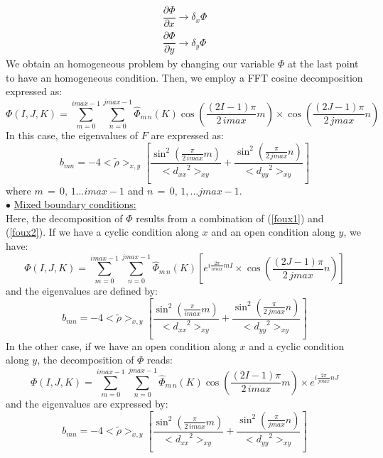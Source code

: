 \begin{eqnarray*}
\dfrac{\partial \Phi}{\partial x} \rightarrow \delta _x \Phi \\
\dfrac{\partial \Phi}{\partial y} \rightarrow \delta _y \Phi
\end{eqnarray*}
We obtain an homogeneous problem by changing our variable $\Phi$ at the last
point to have an homogeneous condition.
 Then, we employ a FFT cosine decomposition expressed as:
\begin{equation}
\label{foux2}
\Phi (I, J, K) =    \sum_{m=0}^{imax-1} \sum_{n=0}^{jmax-1}
\widehat{\Phi}_{m \, n}(K)
\cos \left( \dfrac {(2I - 1) \pi}{2 \, imax} m\right) \times
\cos \left( \dfrac {(2J - 1) \pi}{2 \, jmax} n\right)
\end{equation}
In this case, the eigenvalues of $F$ are expressed as:
\begin{displaymath}
b_{mn} = - 4 <\tilde{\rho}>_{x,y} \left[
\dfrac{\sin ^2 \left( \frac { \pi} {2 \, imax}  m\right)} {<{d_{xx}}^2>_{xy}}
+
\dfrac{\sin ^2 \left( \frac { \pi} {2 \, jmax}  n\right)} {<{d_{yy}}^2>_{xy}}
\right]
\end{displaymath}
where $m\,=\,0, \, 1...imax-1$ and $n\,=\,0,\, 1,...jmax-1$.\\
$\bullet$ \underline{Mixed boundary conditions:}\\
Here, the decomposition of $\Phi$ results from a combination of (\ref{foux1})
and (\ref{foux2}). If we have a cyclic condition along $x$ and an open
condition along $y$, we have:
\begin{equation}
\Phi (I, J, K) =   \sum_{m=0}^{imax-1} \sum_{n=0}^{jmax-1}
\widehat{\Phi}_{m\, n}(K)
\left[ e^ {i\frac {2\pi}{imax} m I } \times
\cos \left( \dfrac {(2J - 1) \pi}{2 \, jmax} n\right) \right]
\end{equation}
and the eigenvalues are defined by:
\begin{equation}
b_{mn} = - 4 < \tilde{\rho} >_{x,y} \left[
\dfrac{\sin ^2 \left( \frac {\pi} {imax} m \right)} {<{d_{xx}}^2>_{xy}} +
\dfrac{\sin ^2 \left( \frac {\pi} {2 \, jmax}  n\right)} {<{d_{yy}}^2>_{xy}}
\right]
\end{equation}
In the other case, if we have an open condition along $x$ and a cyclic
condition along $y$, the decomposition of $\Phi$ reads:
\begin{equation}
\Phi (I, J, K) =   \sum_{m=0}^{imax-1} \sum_{n=0}^{jmax-1}
\widehat{\Phi}_{m\, n}(K)
\cos \left( \dfrac {(2I - 1) \pi}{2 \, imax} m\right) \times
e^ { i\frac {2\pi}{jmax} n J }
\end{equation}
and the eigenvalues are expressed by:
\begin{equation}
b_{mn} = - 4 < \tilde{\rho} >_{x,y} \left[
\dfrac{\sin ^2 \left( \frac { \pi} {2 \, imax}  m\right)} {<{d_{xx}}^2>_{xy}}
 +
\dfrac{\sin ^2 \left( \frac { \pi} {jmax}  n\right)} {<{d_{yy}}^2>_{xy}}
 \right]
\end{equation}
